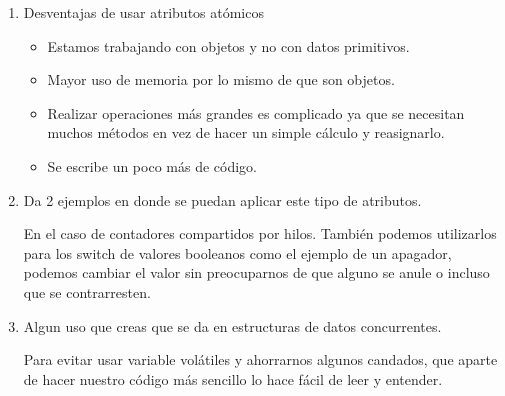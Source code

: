 \documentclass[12pt]{article}
\begin{document}
\begin{enumerate}
    \item Desventajas de usar atributos atómicos\\ \vspace{3mm}

    \begin{itemize}
        \item Estamos trabajando con objetos y no con datos primitivos.
        \item Mayor uso de memoria por lo mismo de que son objetos.
        \item Realizar operaciones m\'as grandes es complicado ya que se necesitan muchos m\'etodos en vez de hacer un simple c\'alculo y reasignarlo.
        \item Se escribe un poco m\'as de c\'odigo.
    \end{itemize}
    
    \item Da 2 ejemplos en donde se puedan aplicar este tipo de atributos.\\ \vspace{3mm}

    En el caso de contadores compartidos por hilos. Tambi\'en podemos utilizarlos para los switch de valores booleanos como el ejemplo de un apagador, podemos cambiar el valor sin preocuparnos de que alguno se anule o incluso que se contrarresten.\\ \vspace{3mm}
    
    \item Algun uso que creas que se da en estructuras de datos concurrentes.\\ \vspace{3mm}

    Para evitar usar variable volátiles y ahorrarnos algunos candados, que aparte de hacer nuestro c\'odigo m\'as sencillo lo hace f\'acil de leer y entender.\\

    
\end{enumerate}
\end{document}
